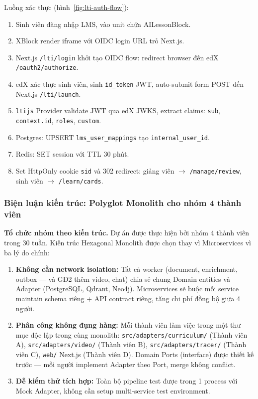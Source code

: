 Luồng xác thực (hình~\ref{fig:lti-auth-flow}):
\begin{enumerate}
    \item Sinh viên đăng nhập LMS, vào unit chứa AILessonBlock.
    \item XBlock render iframe với OIDC login URL trỏ Next.js.
    \item Next.js \texttt{/lti/login} khởi tạo OIDC flow:
          redirect browser đến edX \texttt{/oauth2/authorize}.
    \item edX xác thực sinh viên, sinh \texttt{id\_token} JWT,
          auto-submit form POST đến Next.js \texttt{/lti/launch}.
    \item \texttt{ltijs} Provider validate JWT qua edX JWKS,
          extract claims: \texttt{sub}, \texttt{context.id},
          \texttt{roles}, \texttt{custom}.
    \item Postgres: UPSERT \texttt{lms\_user\_mappings} tạo
          \texttt{internal\_user\_id}.
    \item Redis: SET session với TTL 30 phút.
    \item Set HttpOnly cookie \texttt{sid} và 302 redirect:
          giảng viên $\to$ \texttt{/manage/review},
          sinh viên $\to$ \texttt{/learn/cards}.
\end{enumerate}

\subsubsection{Biện luận kiến trúc: Polyglot Monolith cho nhóm 4 thành viên}

\textbf{Tổ chức nhóm theo kiến trúc.} Dự án được thực hiện bởi nhóm 4
thành viên trong 30 tuần. Kiến trúc Hexagonal Monolith được chọn thay vì
Microservices vì ba lý do chính:

\begin{enumerate}
    \item \textbf{Không cần network isolation:} Tất cả worker (document,
          enrichment, outbox --- và GĐ2 thêm video, chat) chia sẻ chung
          Domain entities và Adapter (PostgreSQL, Qdrant, Neo4j).
          Microservices sẽ buộc mỗi service maintain schema riêng + API
          contract riêng, tăng chi phí đồng bộ giữa 4 người.
    \item \textbf{Phân công không đụng hàng:} Mỗi thành viên làm việc
          trong một thư mục độc lập trong cùng monolith:
          \texttt{src/adapters/curriculum/} (Thành viên A),
          \texttt{src/adapters/video/} (Thành viên B),
          \texttt{src/adapters/tracer/} (Thành viên C),
          \texttt{web/} Next.js (Thành viên D).
          Domain Ports (interface) được thiết kế trước --- mỗi người
          implement Adapter theo Port, merge không conflict.
    \item \textbf{Dễ kiểm thử tích hợp:} Toàn bộ pipeline test được
          trong 1 process với Mock Adapter, không cần setup multi-service
          test environment.
\end{enumerate}

